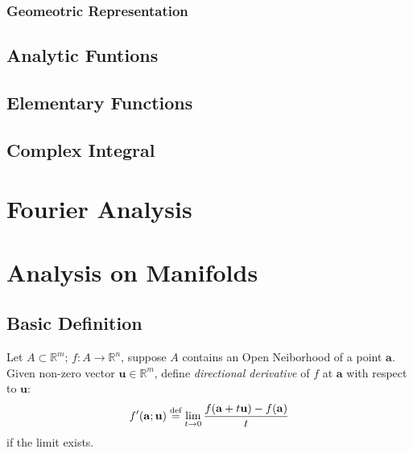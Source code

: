 \documentclass[twoside,openright]{report}
\begin{document}
\subsection{Geomeotric Representation}

\section{Analytic Funtions}

\section{Elementary Functions}

\section{Complex Integral}



\chapter{Fourier Analysis}


\chapter{Analysis on Manifolds}

\section{Basic Definition}

\begin{definition}
    Let $A \subset \mathbb{R}^m$; $f:A \to \mathbb{R}^n$, suppose $A$ contains an Open Neiborhood of a point $\mathbf{a}$. \\
    Given non-zero vector $\mathbf{u} \in \mathbb{R}^m$, define \textit{directional derivative} of $f$ at $\mathbf{a}$ with respect to $\mathbf{u}$:
    \begin{align*}
        f'(\mathbf{a}; \mathbf{u}) \overset{\textnormal{def}}{=} \lim_{t \to 0} \frac{f(\mathbf{a} + t \mathbf{u}) - f(\mathbf{a})}{t}
    \end{align*}
    if the limit exists.
\end{definition}
\end{document}
